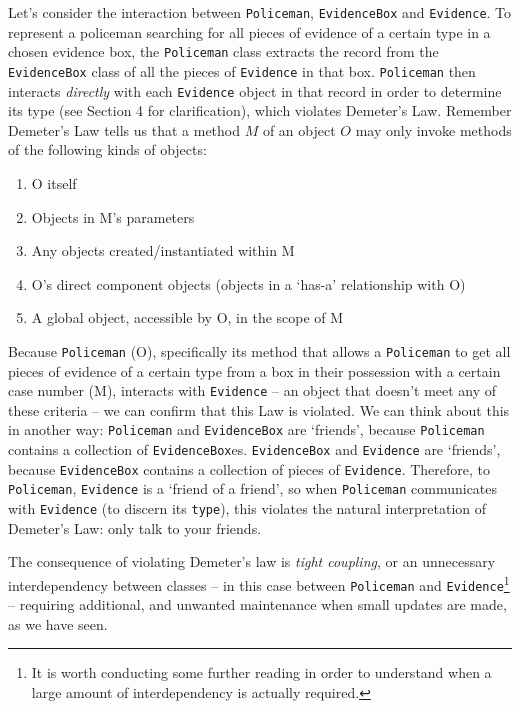 \documentclass[11pt]{article}
\begin{document}
Let's consider the interaction between \texttt{Policeman}, \texttt{EvidenceBox} and \texttt{Evidence}. To represent a policeman searching for all pieces of evidence of a certain type in a chosen evidence box, the \texttt{Policeman} class extracts the record from the \texttt{EvidenceBox} class of all the pieces of \texttt{Evidence} in that box. \texttt{Policeman} then interacts \emph{directly} with each \texttt{Evidence} object in that record in order to determine its type (see Section 4 for clarification), which violates Demeter's Law. Remember Demeter's Law tells us that a method $M$ of an object $O$ may only invoke methods of the following kinds of objects:

\begin{enumerate}

	\item O itself
	\item Objects in M's parameters
	\item Any objects created/instantiated within M
	\item O's direct component objects (objects in a `has-a' relationship with O)
	\item A global object, accessible by O, in the scope of M

\end{enumerate}

Because \texttt{Policeman} (O), specifically its method that allows a \texttt{Policeman} to get all pieces of evidence of a certain type from a box in their possession with a certain case number (M), interacts with \texttt{Evidence} -- an object that doesn't meet any of these criteria -- we can confirm that this Law is violated. We can think about this in another way: \texttt{Policeman} and \texttt{EvidenceBox} are `friends', because \texttt{Policeman} contains a collection of \texttt{EvidenceBox}es. \texttt{EvidenceBox} and \texttt{Evidence} are `friends', because \texttt{EvidenceBox} contains a collection of pieces of \texttt{Evidence}. Therefore, to \texttt{Policeman}, \texttt{Evidence} is a `friend of a friend', so when \texttt{Policeman} communicates with \texttt{Evidence} (to discern its \texttt{type}), this violates the natural interpretation of Demeter's Law: only talk to your friends.

The consequence of violating Demeter's law is \emph{tight coupling}, or an unnecessary interdependency between classes -- in this case between \texttt{Policeman} and \texttt{Evidence}\footnote{It is worth conducting some further reading in order to understand when a large amount of interdependency is actually required.} -- requiring additional, and unwanted maintenance when small updates are made, as we have seen.
\end{document}
